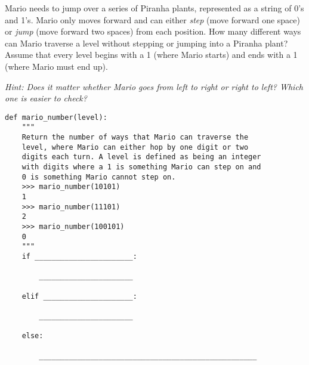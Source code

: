 \begin{blocksection}



\question Mario needs to jump over a series of Piranha plants, represented as a
string of 0's and 1's. Mario only moves forward and can
either \emph{step} (move forward one space) or \emph{jump} (move forward two
spaces) from each position. How many different ways can Mario traverse a level
without stepping or jumping into a Piranha plant? Assume that every level begins
with a 1 (where Mario starts) and ends with a 1 (where
Mario must end up).


\textit{Hint: Does it matter whether Mario goes from left to right or right to left? Which
one is easier to check?}

\begin{lstlisting}
def mario_number(level):
    """
    Return the number of ways that Mario can traverse the
    level, where Mario can either hop by one digit or two
    digits each turn. A level is defined as being an integer
    with digits where a 1 is something Mario can step on and
    0 is something Mario cannot step on.
    >>> mario_number(10101)
    1
    >>> mario_number(11101)
    2
    >>> mario_number(100101)
    0
    """
    if _______________________:

        ______________________

    elif _____________________:

        ______________________

    else:

        ___________________________________________________
\end{lstlisting}
\end{blocksection}

